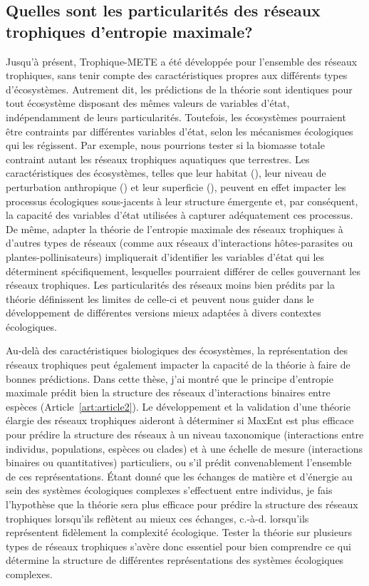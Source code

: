\subsection{Quelles sont les particularités des réseaux trophiques d'entropie maximale?} 

Jusqu'à présent, Trophique-METE a été développée pour l'ensemble des réseaux
trophiques, sans tenir compte des caractéristiques propres aux différents types
d'écosystèmes. Autrement dit, les prédictions de la théorie sont identiques pour
tout écosystème disposant des mêmes valeurs de variables d'état, indépendamment
de leurs particularités. Toutefois, les écosystèmes pourraient être contraints
par différentes variables d'état, selon les mécanismes écologiques qui les
régissent. Par exemple, nous pourrions tester si la biomasse totale contraint
autant les réseaux trophiques aquatiques que terrestres. Les caractéristiques
des écosystèmes, telles que leur habitat (\cite{Shurin2005All}), leur niveau de
perturbation anthropique (\cite{Tylianakis2007Habitat}) et leur superficie
(\cite{Galiana2018Spatiala}), peuvent en effet impacter les processus
écologiques sous-jacents à leur structure émergente et, par conséquent, la
capacité des variables d'état utilisées à capturer adéquatement ces processus.
De même, adapter la théorie de l'entropie maximale des réseaux trophiques à
d'autres types de réseaux (comme aux réseaux d'interactions hôtes-parasites ou
plantes-pollinisateurs) impliquerait d'identifier les variables d'état qui les
déterminent spécifiquement, lesquelles pourraient différer de celles gouvernant
les réseaux trophiques. Les particularités des réseaux moins bien prédits par la
théorie définissent les limites de celle-ci et peuvent nous guider dans le
développement de différentes versions mieux adaptées à divers contextes
écologiques.

Au-delà des caractéristiques biologiques des écosystèmes, la représentation des
réseaux trophiques peut également impacter la capacité de la théorie à faire de
bonnes prédictions. Dans cette thèse, j'ai montré que le principe d'entropie
maximale prédit bien la structure des réseaux d'interactions binaires entre
espèces (Article~\ref{art:article2}). Le développement et la validation d'une
théorie élargie des réseaux trophiques aideront à déterminer si MaxEnt est plus
efficace pour prédire la structure des réseaux à un niveau taxonomique
(interactions entre individus, populations, espèces ou clades) et à une échelle
de mesure (interactions binaires ou quantitatives) particuliers, ou s'il prédit
convenablement l'ensemble de ces représentations. Étant donné que les échanges
de matière et d'énergie au sein des systèmes écologiques complexes s'effectuent
entre individus, je fais l'hypothèse que la théorie sera plus efficace pour
prédire la structure des réseaux trophiques lorsqu'ils reflètent au mieux ces
échanges, c.-à-d. lorsqu'ils représentent fidèlement la complexité écologique.
Tester la théorie sur plusieurs types de réseaux trophiques s'avère donc
essentiel pour bien comprendre ce qui détermine la structure de différentes
représentations des systèmes écologiques complexes. 

